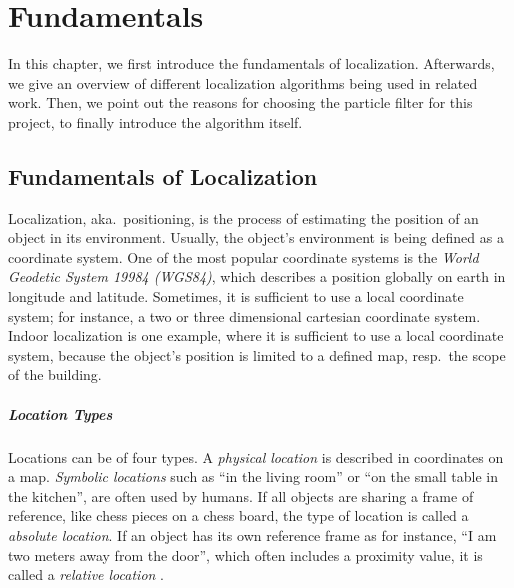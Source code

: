 \chapter{Fundamentals}\label{chap:fundamentals}

In this chapter, we first introduce the fundamentals of localization. Afterwards, we give an overview of different localization algorithms being used in related work. Then, we point out the reasons for choosing the particle filter for this project, to finally introduce the algorithm itself.

\section{Fundamentals of Localization}

Localization, aka.\ positioning, is the process of estimating the position of an object in its environment. Usually, the object's environment is being defined as a coordinate system. One of the most popular coordinate systems is the \emph{World Geodetic System 19984 (WGS84)}, which describes a position globally on earth in longitude and latitude. Sometimes, it is sufficient to use a local coordinate system; for instance, a two or three dimensional cartesian coordinate system. Indoor localization is one example, where it is sufficient to use a local coordinate system, because the object's position is limited to a defined map, resp.\ the scope of the building.

\paragraph{Location Types}
Locations can be of four types. A \emph{physical location} is described in coordinates on a map. \emph{Symbolic locations} such as ``in the living room'' or ``on the small table in the kitchen'', are often used by humans. If all objects are sharing a frame of reference, like chess pieces on a chess board, the type of location is called a \emph{absolute location}. If an object has its own reference frame as for instance, ``I am two meters away from the door'', which often includes a proximity value, it is called a \emph{relative location} \citep{IEEE:survey_wireless_indoor_pos}.

